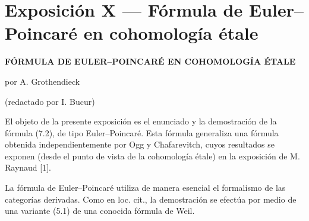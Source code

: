 \section*{Exposición X --- Fórmula de Euler--Poincaré en cohomología étale}

\begin{center}
\textbf{FÓRMULA DE EULER--POINCARÉ EN COHOMOLOGÍA ÉTALE}

por A. Grothendieck

(redactado por I. Bucur)
\end{center}

El objeto de la presente exposición es el enunciado y la demostración de la fórmula (7.2), de tipo Euler--Poincaré. Esta fórmula generaliza una fórmula obtenida independientemente por Ogg y Chafarevitch, cuyos resultados se exponen (desde el punto de vista de la cohomología étale) en la exposición de M. Raynaud [1].

La fórmula de Euler--Poincaré utiliza de manera esencial el formalismo de las categorías derivadas. Como en loc. cit., la demostración se efectúa por medio de una variante (5.1) de una conocida fórmula de Weil.
